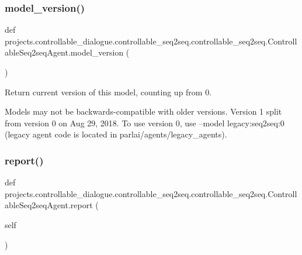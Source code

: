 \subsubsection{\texorpdfstring{model\+\_\+version()}{model\_version()}}
{\footnotesize\ttfamily def projects.\+controllable\+\_\+dialogue.\+controllable\+\_\+seq2seq.\+controllable\+\_\+seq2seq.\+Controllable\+Seq2seq\+Agent.\+model\+\_\+version (\begin{DoxyParamCaption}{ }\end{DoxyParamCaption})\hspace{0.3cm}{\ttfamily [static]}}

\begin{DoxyVerb}Return current version of this model, counting up from 0.

Models may not be backwards-compatible with older versions. Version 1 split from
version 0 on Aug 29, 2018. To use version 0, use --model legacy:seq2seq:0
(legacy agent code is located in parlai/agents/legacy_agents).
\end{DoxyVerb}
 \mbox{\label{classprojects_1_1controllable__dialogue_1_1controllable__seq2seq_1_1controllable__seq2seq_1_1ControllableSeq2seqAgent_aa976447be9a59cdba202d947bb5dafbb}} 
\subsubsection{\texorpdfstring{report()}{report()}}
{\footnotesize\ttfamily def projects.\+controllable\+\_\+dialogue.\+controllable\+\_\+seq2seq.\+controllable\+\_\+seq2seq.\+Controllable\+Seq2seq\+Agent.\+report (\begin{DoxyParamCaption}\item[{}]{self }\end{DoxyParamCaption})}

